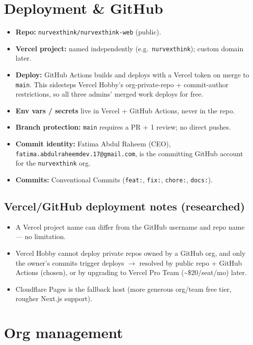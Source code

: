 \documentclass[11pt,a4paper]{article}
\begin{document}
\section{Deployment \& GitHub}
\begin{itemize}
  \item \textbf{Repo:} \texttt{nurvexthink/nurvexthink-web} (public).
  \item \textbf{Vercel project:} named independently (e.g.\ \texttt{nurvexthink}); custom domain later.
  \item \textbf{Deploy:} GitHub Actions builds and deploys with a Vercel token on merge to \texttt{main}.
        This sidesteps Vercel Hobby's org-private-repo + commit-author restrictions, so all three
        admins' merged work deploys for free.
  \item \textbf{Env vars / secrets} live in Vercel + GitHub Actions, never in the repo.
  \item \textbf{Branch protection:} \texttt{main} requires a PR + 1 review; no direct pushes.
  \item \textbf{Commit identity:} Fatima Abdul Raheem (CEO), \texttt{fatima.abdulraheemdev.17@gmail.com},
        is the committing GitHub account for the \texttt{nurvexthink} org.
  \item \textbf{Commits:} Conventional Commits (\texttt{feat:}, \texttt{fix:}, \texttt{chore:}, \texttt{docs:}).
\end{itemize}

\subsection{Vercel/GitHub deployment notes (researched)}
\begin{itemize}
  \item A Vercel project name can differ from the GitHub username and repo name --- no limitation.
  \item Vercel Hobby cannot deploy private repos owned by a GitHub org, and only the owner's
        commits trigger deploys $\rightarrow$ resolved by public repo + GitHub Actions (chosen),
        or by upgrading to Vercel Pro Team (\textasciitilde\$20/seat/mo) later.
  \item Cloudflare Pages is the fallback host (more generous org/team free tier, rougher Next.js support).
\end{itemize}

\section{Org management}
\end{document}
